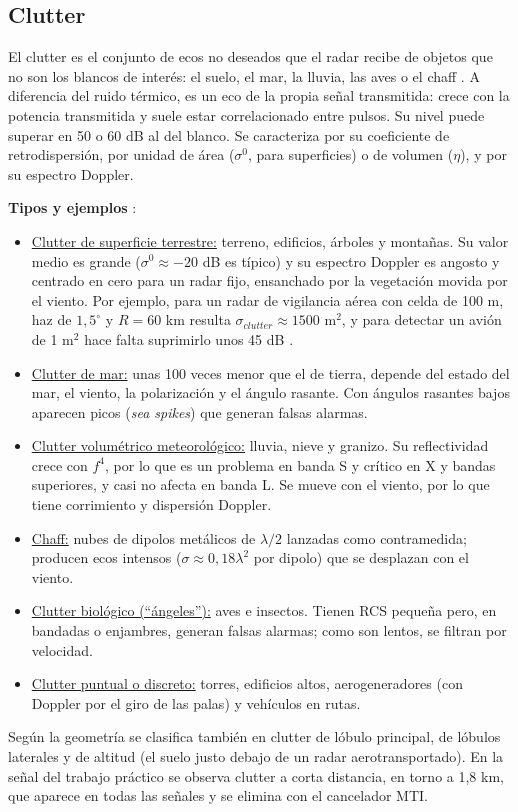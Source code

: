 \subsection{Clutter}
\label{sec:clutter}

El clutter es el conjunto de ecos no deseados que el radar recibe de objetos que no son los blancos de interés: el suelo, el mar, la lluvia, las aves o el chaff \cite{skolnik, apunte}. A diferencia del ruido térmico, es un eco de la propia señal transmitida: crece con la potencia transmitida y suele estar correlacionado entre pulsos. Su nivel puede superar en 50 o 60 dB al del blanco. Se caracteriza por su coeficiente de retrodispersión, por unidad de área ($\sigma^0$, para superficies) o de volumen ($\eta$), y por su espectro Doppler.

\textbf{Tipos y ejemplos} \cite{apunte, skolnik}:
\begin{itemize}
    \item \underline{Clutter de superficie terrestre:} terreno, edificios, árboles y montañas. Su valor medio es grande ($\sigma^0 \approx -20$ dB es típico) y su espectro Doppler es angosto y centrado en cero para un radar fijo, ensanchado por la vegetación movida por el viento. Por ejemplo, para un radar de vigilancia aérea con celda de 100 m, haz de $1{,}5^\circ$ y $R = 60$ km resulta $\sigma_{clutter} \approx 1500$ m$^2$, y para detectar un avión de 1 m$^2$ hace falta suprimirlo unos 45 dB \cite{apunte}.
    \item \underline{Clutter de mar:} unas 100 veces menor que el de tierra, depende del estado del mar, el viento, la polarización y el ángulo rasante. Con ángulos rasantes bajos aparecen picos (\textit{sea spikes}) que generan falsas alarmas.
    \item \underline{Clutter volumétrico meteorológico:} lluvia, nieve y granizo. Su reflectividad crece con $f^4$, por lo que es un problema en banda S y crítico en X y bandas superiores, y casi no afecta en banda L. Se mueve con el viento, por lo que tiene corrimiento y dispersión Doppler.
    \item \underline{Chaff:} nubes de dipolos metálicos de $\lambda/2$ lanzadas como contramedida; producen ecos intensos ($\sigma \approx 0{,}18\lambda^2$ por dipolo) que se desplazan con el viento.
    \item \underline{Clutter biológico (``ángeles''):} aves e insectos. Tienen RCS pequeña pero, en bandadas o enjambres, generan falsas alarmas; como son lentos, se filtran por velocidad.
    \item \underline{Clutter puntual o discreto:} torres, edificios altos, aerogeneradores (con Doppler por el giro de las palas) y vehículos en rutas.
\end{itemize}
Según la geometría se clasifica también en clutter de lóbulo principal, de lóbulos laterales y de altitud (el suelo justo debajo de un radar aerotransportado). En la señal del trabajo práctico se observa clutter a corta distancia, en torno a 1,8 km, que aparece en todas las señales y se elimina con el cancelador MTI.

